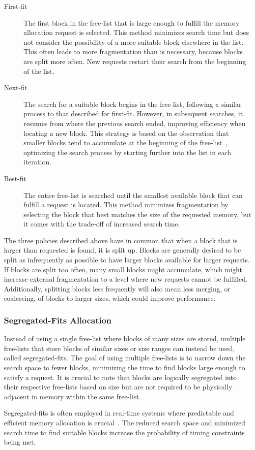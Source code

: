 \begin{description}
  \item[First-fit]
    The first block in the free-list that is large enough to fulfill the memory allocation request is selected. This method minimizes search time but does not consider the possibility of a more suitable block elsewhere in the list. This often leads to more fragmentation than is necessary, because blocks are split more often. New requests restart their search from the beginning of the list.
  \item[Next-fit]
    The search for a suitable block begins in the free-list, following a similar process to that described for first-fit. However, in subsequent searches, it resumes from where the previous search ended, improving efficiency when locating a new block. This strategy is based on the observation that smaller blocks tend to accumulate at the beginning of the free-list~\cite{gchandbook}, optimizing the search process by starting further into the list in each iteration.
  \item[Best-fit]
    The entire free-list is searched until the smallest available block that can fulfill a request is located. This method minimizes fragmentation by selecting the block that best matches the size of the requested memory, but it comes with the trade-off of increased search time.
\end{description}

The three policies described above have in common that when a block that is larger than requested is found, it is split up. Blocks are generally desired to be split as infrequently as possible to have larger blocks available for larger requests. If blocks are split too often, many small blocks might accumulate, which might increase external fragmentation to a level where new requests cannot be fulfilled. Additionally, splitting blocks less frequently will also mean less merging, or coalescing, of blocks to larger sizes, which could improve performance.

\subsubsection{Segregated-Fits Allocation}

Instead of using a single free-list where blocks of many sizes are stored, multiple free-lists that store blocks of similar sizes or size ranges can instead be used, called segregated-fits. The goal of using multiple free-lists is to narrow down the search space to fewer blocks, minimizing the time to find blocks large enough to satisfy a request. It is crucial to note that blocks are logically segregated into their respective free-lists based on size but are not required to be physically adjacent in memory within the same free-list.

Segregated-fits is often employed in real-time systems where predictable and efficient memory allocation is crucial~\cite{gchandbook, TLSF}. The reduced search space and minimized search time to find suitable blocks increase the probability of timing constraints being met.

